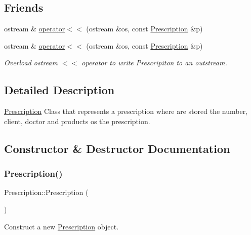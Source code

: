 \subsection*{Friends}
\begin{DoxyCompactItemize}
\item 
ostream \& \hyperlink{classPrescription_a3daeb997a2f3f9666159cf018d0d1c28}{operator$<$$<$} (ostream \&os, const \hyperlink{classPrescription}{Prescription} \&p)
\item 
ostream \& \hyperlink{classPrescription_a3daeb997a2f3f9666159cf018d0d1c28}{operator$<$$<$} (ostream \&os, const \hyperlink{classPrescription}{Prescription} \&p)
\begin{DoxyCompactList}\small\item\em Overload ostream $<$$<$ operator to write Prescripiton to an outstream. \end{DoxyCompactList}\end{DoxyCompactItemize}


\subsection{Detailed Description}
\hyperlink{classPrescription}{Prescription} Class that represents a prescription where are stored the number, client, doctor and products os the prescription. 

\subsection{Constructor \& Destructor Documentation}
\mbox{\label{classPrescription_a8dce6fbdb5b57a18c45de8992bf5d600}} 
\subsubsection{\texorpdfstring{Prescription()}{Prescription()}\hspace{0.1cm}{\footnotesize\ttfamily [1/2]}}
{\footnotesize\ttfamily Prescription\+::\+Prescription (\begin{DoxyParamCaption}{ }\end{DoxyParamCaption})}



Construct a new \hyperlink{classPrescription}{Prescription} object. 

\mbox{\label{classPrescription_a7be35e4e8ddb08878fd4fcbf308f9d2b}} 

